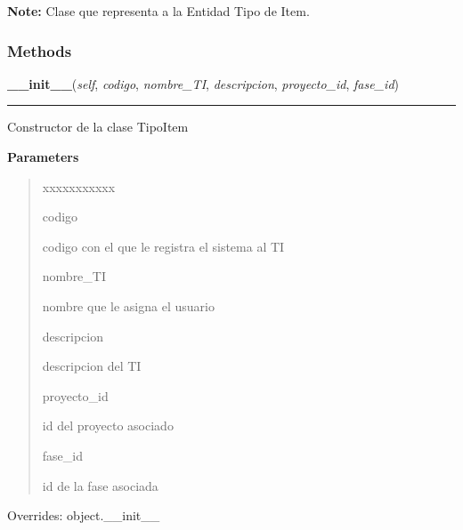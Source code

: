 \textbf{Note:} Clase que representa a la Entidad Tipo de Item.





  \subsubsection{Methods}

    \vspace{0.5ex}

\hspace{.8\funcindent}\begin{boxedminipage}{\funcwidth}

    \raggedright \textbf{\_\_init\_\_}(\textit{self}, \textit{codigo}, \textit{nombre\_TI}, \textit{descripcion}, \textit{proyecto\_id}, \textit{fase\_id})

    \vspace{-1.5ex}

    \rule{\textwidth}{0.5\fboxrule}
\setlength{\parskip}{2ex}
    Constructor de la clase TipoItem

\setlength{\parskip}{1ex}
      \textbf{Parameters}
      \vspace{-1ex}

      \begin{quote}
        \begin{Ventry}{xxxxxxxxxxx}

          \item[codigo]

          codigo con el que le registra el sistema al TI

          \item[nombre\_TI]

          nombre que le asigna el usuario

          \item[descripcion]

          descripcion del TI

          \item[proyecto\_id]

          id del proyecto asociado

          \item[fase\_id]

          id de la fase asociada

        \end{Ventry}

      \end{quote}

      Overrides: object.\_\_init\_\_

    \end{boxedminipage}



